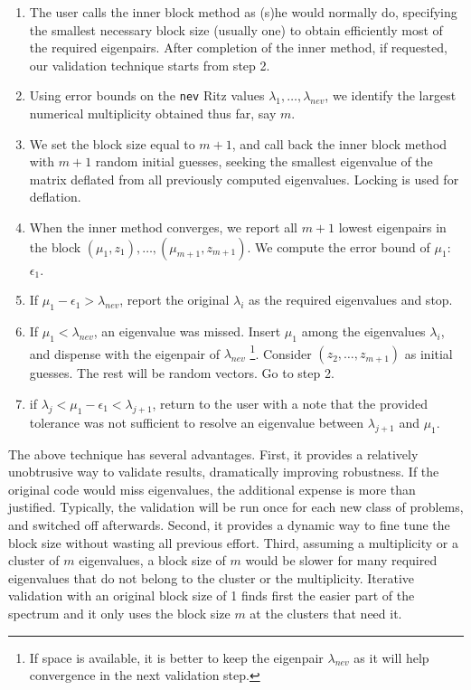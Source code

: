 \documentclass{report}
\begin{document}
\begin{enumerate}
\item
The user calls the inner block method as (s)he would normally do,
specifying the smallest necessary block size (usually one) to obtain
efficiently most of the required eigenpairs.
After completion of the inner method, if requested,
our validation technique starts from step 2.

\item
Using error bounds on the {\tt nev} Ritz values
$\lambda_1, \ldots , \lambda_{nev}$, we identify the largest
numerical multiplicity obtained thus far, say $m$.

\item
We set the block size equal to $m+1$, and call back the inner
block method with $m+1$ random initial guesses,
seeking the smallest eigenvalue of the matrix
deflated from all previously computed eigenvalues.
Locking is used for deflation.

\item
When the inner method converges, we report
all $m+1$ lowest eigenpairs in the block
$(\mu_1, z_1), \ldots , (\mu_{m+1}, z_{m+1})$.
We compute the error bound of $\mu_1$: $\epsilon_1$.

\item
If $\mu_1 - \epsilon_1 > \lambda_{nev}$, report the original $\lambda_i$
as the required eigenvalues and stop.

\item
If $\mu_1 < \lambda_{nev}$, an eigenvalue was missed.
Insert $\mu_1$ among the eigenvalues $\lambda_i$,
and dispense with the eigenpair of $\lambda_{nev}$
\footnote{If space is available, it is better to keep the
eigenpair $\lambda_{nev}$ as it will help convergence in the
next validation step.}.
Consider $(z_2, \ldots , z_{m+1})$ as initial guesses. The rest
will be random vectors.
Go to step 2.

\item
if $\lambda_j < \mu_1 - \epsilon_1 < \lambda_{j+1}$, return to the
user with a note that the provided tolerance
was not sufficient to resolve an eigenvalue between $\lambda_{j+1}$
and $\mu_1$.

\end{enumerate}

The above technique has several advantages.
First, it provides a relatively unobtrusive way to
validate results, dramatically improving robustness.
If the original code would miss eigenvalues,
the additional expense is more than justified.
Typically, the validation will be run once for each new class of
problems, and switched off afterwards.
Second, it provides a dynamic way to fine tune the block size without
wasting all previous effort.
Third, assuming a multiplicity or a cluster of $m$ eigenvalues,
a block size of $m$ would be slower for many
required eigenvalues that do not belong to the cluster or
the multiplicity.
Iterative validation with an original block size of 1 finds first
the easier part of the spectrum and it only uses the block size
$m$ at the clusters that need it.
\end{document}
